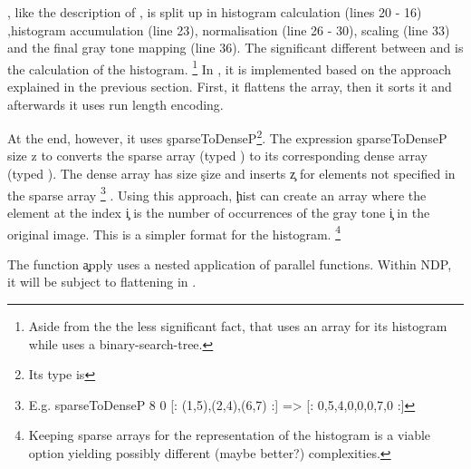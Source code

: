   \ndpn, like the description of \algo, 
  is split up in histogram calculation (lines 20 - 16)
  ,histogram accumulation (line 23), normalisation (line 26 - 30),
  scaling (line 33) and the final gray tone mapping (line 36).
  The significant different between \ndpn and \seq is the calculation of the histogram.
  \footnote{Aside from the the less significant fact, that \ndpn uses an array for its histogram while \seq uses a binary-search-tree.}
  In \ndpn, it is implemented based on the approach explained in the
  previous section. First, it flattens the array, then it sorts it and afterwards
  it uses run length encoding.
  
  At the end, however, it uses \c{sparseToDenseP}\footnote{Its type is  }.
  The expression \c{sparseToDenseP size z} to converts the sparse array (typed )
  to its corresponding dense array (typed \type{[:Int:]}).
  The dense array has size \c{size} and inserts \c{z} for elements not specified in the sparse array
  \footnote{E.g. \c{ sparseToDenseP 8 0 [: (1,5),(2,4),(6,7) :] => [: 0,5,4,0,0,0,7,0 :]}}
  .
  Using this approach, \c{hist} can create an array where
  the element at the index \c{i} is the number of occurrences
  of the gray tone \c{i} in the original image.
  This is a simpler format for the histogram.
  \footnote{Keeping sparse arrays for the representation of the histogram is a viable option yielding possibly different (maybe better?) complexities.}
  
  The function \c{apply} uses a nested application of parallel functions.
  Within NDP, it will be subject to flattening in \ndpv.
  
